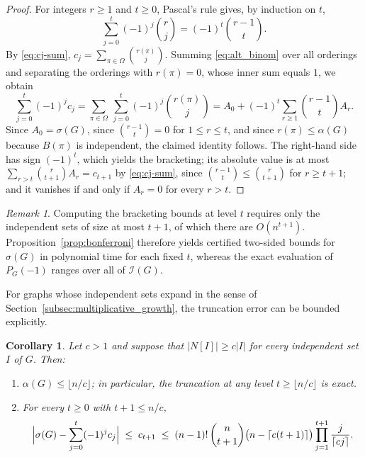\documentclass[11pt,a4paper]{article}
\numberwithin{equation}{section}
\theoremstyle{plain}
\newtheorem{corollary}[theorem]{Corollary}
\theoremstyle{definition}
\theoremstyle{remark}
\newtheorem{remark}[theorem]{Remark}
\begin{document}
\begin{proof}
For integers \(r\ge 1\) and \(t\ge 0\), Pascal's rule gives, by induction on \(t\),
\begin{equation}\label{eq:alt_binom}
\sum_{j=0}^{t}(-1)^j\binom{r}{j}=(-1)^t\binom{r-1}{t}.
\end{equation}
By \eqref{eq:cj-sum}, \(c_j=\sum_{\pi\in\Omega}\binom{r(\pi)}{j}\). Summing
\eqref{eq:alt_binom} over all orderings and separating the orderings with
\(r(\pi)=0\), whose inner sum equals \(1\), we obtain
\[
\sum_{j=0}^{t}(-1)^j c_j
=
\sum_{\pi\in\Omega}\ \sum_{j=0}^{t}(-1)^j\binom{r(\pi)}{j}
=
A_0+(-1)^t\sum_{r\ge 1}\binom{r-1}{t}A_r.
\]
Since \(A_0=\sigma(G)\), since \(\binom{r-1}{t}=0\) for \(1\le r\le t\), and since
\(r(\pi)\le\alpha(G)\) because \(B(\pi)\) is independent, the claimed identity
follows. The right-hand side has sign \((-1)^t\), which yields the bracketing;
its absolute value is at most
\(\sum_{r>t}\binom{r}{t+1}A_r=c_{t+1}\) by \eqref{eq:cj-sum}, since
\(\binom{r-1}{t}\le\binom{r}{t+1}\) for \(r\ge t+1\); and it vanishes if and only if
\(A_r=0\) for every \(r>t\).
\end{proof}

\begin{remark}
Computing the bracketing bounds at level \(t\) requires only the independent sets of
size at most \(t+1\), of which there are \(O(n^{t+1})\). Proposition~\ref{prop:bonferroni}
therefore yields certified two-sided bounds for \(\sigma(G)\) in polynomial time for
each fixed \(t\), whereas the exact evaluation of \(P_G(-1)\) ranges over all of
\(\mathcal I(G)\).
\end{remark}

For graphs whose independent sets expand in the sense of
Section~\ref{subsec:multiplicative_growth}, the truncation error can be bounded explicitly.

\begin{corollary}\label{cor:sigma_expansion}
Let \(c>1\) and suppose that \(|N[I]|\ge c|I|\) for every independent set \(I\) of
\(G\). Then:
\begin{enumerate}[label=(\roman*)]
\item \(\alpha(G)\le\lfloor n/c\rfloor\); in particular, the truncation at any level
\(t\ge\lfloor n/c\rfloor\) is exact.
\item For every \(t\ge 0\) with \(t+1\le n/c\),
\[
\Bigl|\sigma(G)-\sum_{j=0}^{t}(-1)^j c_j\Bigr|
\;\le\;
c_{t+1}
\;\le\;
(n-1)!\,\binom{n}{t+1}\bigl(n-\lceil c(t+1)\rceil\bigr)
\prod_{j=1}^{t+1}\frac{j}{\lceil cj\rceil}.
\]
\end{enumerate}
\end{corollary}
\end{document}
